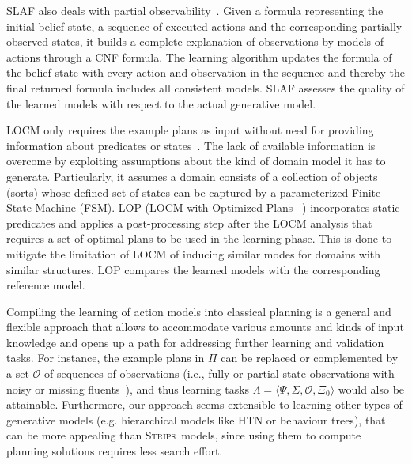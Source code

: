 \documentclass[letterpaper]{article} %
\newcommand{\tup}[1]{{\langle #1 \rangle}}
\newcommand{\strips}{\textsc{Strips}}     %
\begin{document}
{\sc SLAF} also deals with partial observability~\cite{amir:alearning:JAIR08}. Given a formula representing the initial belief state, a sequence of executed actions and the corresponding partially observed states, it builds a complete explanation of observations by models of actions through a CNF formula. The learning algorithm updates the formula of the belief state with every action and observation in the sequence and thereby the final returned formula includes all consistent models. SLAF assesses the quality of the learned models with respect to the actual generative model.



{\sf LOCM} only requires the example plans as input without need for providing information about predicates or states~\cite{cresswell2013acquiring,cresswell2011generalised}. The lack of available information is overcome by exploiting assumptions about the kind of domain model it has to generate. Particularly, it assumes a domain consists of a collection of objects (sorts) whose defined set of states can be captured by a parameterized Finite State Machine (FSM). {\sf LOP} ({\sf LOCM} with Optimized Plans ~\cite{gregory2015domain})  incorporates static predicates and applies a post-processing step after the {\sf LOCM} analysis that requires a set of optimal plans to be used in the learning phase. This is done to mitigate the limitation of {\sf LOCM} of inducing similar modes for domains with similar structures. {\sf LOP} compares the learned models with the corresponding reference model.

Compiling the learning of action models into classical planning is a general and flexible approach that allows to accommodate various amounts and kinds of input knowledge and opens up a path for addressing further learning and validation tasks. For instance, the example plans in $\Pi$ can be replaced or complemented by a set $\mathcal{O}$ of sequences of observations (i.e., fully or partial state observations with noisy or missing fluents~\cite{SohrabiRU16}), and thus learning tasks $\Lambda=\tup{\Psi,\Sigma,\mathcal{O},\Xi_0}$ would also be attainable. Furthermore, our approach seems extensible to learning other types of generative models (e.g. hierarchical models like HTN or behaviour trees), that can be more appealing than \strips\ models, since using them to compute planning solutions requires less search effort.
\end{document}
